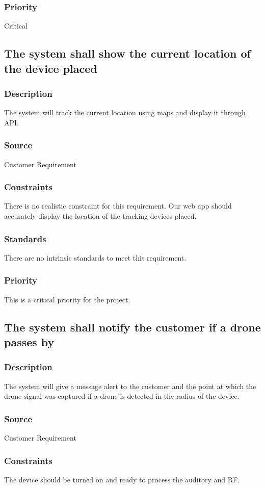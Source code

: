 \subsubsection{Priority}
Critical

\subsection{The system shall show the current location of the device placed}
\subsubsection{Description}
The system will track the current location using maps and display it through API.
\subsubsection{Source}
Customer Requirement
\subsubsection{Constraints}
There is no realistic constraint for this requirement. Our web app should accurately display the location of the tracking devices placed.
\subsubsection{Standards}
There are no intrinsic standards to meet this requirement.
\subsubsection{Priority}
This is a critical priority for the project.

\subsection{The system shall notify the customer if a drone passes by}
\subsubsection{Description}
The system will give a message alert to the customer and the point at which the drone signal was captured if a drone is detected in the radius of the device.
\subsubsection{Source}
Customer Requirement
\subsubsection{Constraints}
The device should be turned on and ready to process the auditory and RF.
